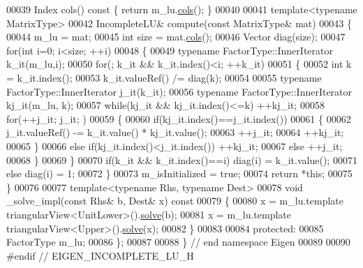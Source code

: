 \begin{DoxyCode}
00039     Index cols()\textcolor{keyword}{ const }\{ \textcolor{keywordflow}{return} m\_lu.\hyperlink{group___sparse_core___module_aa391750e3c530227e4a5c3c52e959975}{cols}(); \}
00040 
00041     \textcolor{keyword}{template}<\textcolor{keyword}{typename} MatrixType>
00042     IncompleteLU& compute(\textcolor{keyword}{const} MatrixType& mat)
00043     \{
00044       m\_lu = mat;
00045       \textcolor{keywordtype}{int} size = mat.\hyperlink{group___sparse_core___module_aa391750e3c530227e4a5c3c52e959975}{cols}();
00046       Vector diag(size);
00047       \textcolor{keywordflow}{for}(\textcolor{keywordtype}{int} i=0; i<size; ++i)
00048       \{
00049         \textcolor{keyword}{typename} FactorType::InnerIterator k\_it(m\_lu,i);
00050         \textcolor{keywordflow}{for}(; k\_it && k\_it.index()<i; ++k\_it)
00051         \{
00052           \textcolor{keywordtype}{int} k = k\_it.index();
00053           k\_it.valueRef() /= diag(k);
00054 
00055           \textcolor{keyword}{typename} FactorType::InnerIterator j\_it(k\_it);
00056           \textcolor{keyword}{typename} FactorType::InnerIterator kj\_it(m\_lu, k);
00057           \textcolor{keywordflow}{while}(kj\_it && kj\_it.index()<=k) ++kj\_it;
00058           \textcolor{keywordflow}{for}(++j\_it; j\_it; )
00059           \{
00060             \textcolor{keywordflow}{if}(kj\_it.index()==j\_it.index())
00061             \{
00062               j\_it.valueRef() -= k\_it.value() * kj\_it.value();
00063               ++j\_it;
00064               ++kj\_it;
00065             \}
00066             \textcolor{keywordflow}{else} \textcolor{keywordflow}{if}(kj\_it.index()<j\_it.index()) ++kj\_it;
00067             \textcolor{keywordflow}{else}                                ++j\_it;
00068           \}
00069         \}
00070         \textcolor{keywordflow}{if}(k\_it && k\_it.index()==i) diag(i) = k\_it.value();
00071         \textcolor{keywordflow}{else}                        diag(i) = 1;
00072       \}
00073       m\_isInitialized = \textcolor{keyword}{true};
00074       \textcolor{keywordflow}{return} *\textcolor{keyword}{this};
00075     \}
00076 
00077     \textcolor{keyword}{template}<\textcolor{keyword}{typename} Rhs, \textcolor{keyword}{typename} Dest>
00078     \textcolor{keywordtype}{void} \_solve\_impl(\textcolor{keyword}{const} Rhs& b, Dest& x)\textcolor{keyword}{ const}
00079 \textcolor{keyword}{    }\{
00080       x = m\_lu.template triangularView<UnitLower>().\hyperlink{group___sparse_core___module_a4a66e9498b06e3ec4ec36f06b26d4e8f}{solve}(b);
00081       x = m\_lu.template triangularView<Upper>().\hyperlink{group___sparse_core___module_a4a66e9498b06e3ec4ec36f06b26d4e8f}{solve}(x);
00082     \}
00083 
00084   \textcolor{keyword}{protected}:
00085     FactorType m\_lu;
00086 \};
00087 
00088 \} \textcolor{comment}{// end namespace Eigen}
00089 
00090 \textcolor{preprocessor}{#endif // EIGEN\_INCOMPLETE\_LU\_H}
\end{DoxyCode}
